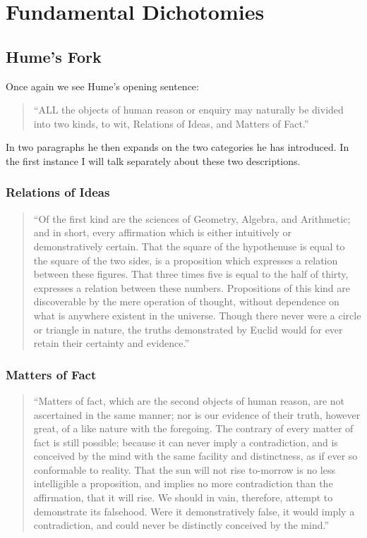 \def\rbjidfork{$$Id: fork.tex,v 1.4 2011/11/04 16:38:42 rbj Exp $$}

\chapter{Fundamental Dichotomies}



\section{Hume's Fork}\label{HumesFork}

Once again we see Hume's opening sentence\cite{humeECHU}:

\begin{quote}
``ALL the objects of human reason or enquiry may naturally be divided into two kinds, to wit, Relations of Ideas, and Matters of Fact.''
\end{quote}

In two paragraphs he then expands on the two categories he has introduced.
In the first instance I will talk separately about these two descriptions.

\subsection{Relations of Ideas}

\begin{quote}
``Of the first kind are the sciences of Geometry, Algebra, and Arithmetic; and in short, every affirmation which is either intuitively or demonstratively certain. That the square of the hypothenuse is equal to the square of the two sides, is a proposition which expresses a relation between these figures. That three times five is equal to the half of thirty, expresses a relation between these numbers. Propositions of this kind are discoverable by the mere operation of thought, without dependence on what is anywhere existent in the universe. Though there never were a circle or triangle in nature, the truths demonstrated by Euclid would for ever retain their certainty and evidence.''
\end{quote}

\subsection{Matters of Fact}

\begin{quote}
``Matters of fact, which are the second objects of human reason, are not ascertained in the same manner; nor is our evidence of their truth, however great, of a like nature with the foregoing. The contrary of every matter of fact is still possible; because it can never imply a contradiction, and is conceived by the mind with the same facility and distinctness, as if ever so conformable to reality. That the sun will not rise to-morrow is no less intelligible a proposition, and implies no more contradiction than the affirmation, that it will rise. We should in vain, therefore, attempt to demonstrate its falsehood. Were it demonstratively false, it would imply a contradiction, and could never be distinctly conceived by the mind.''
\end{quote}

